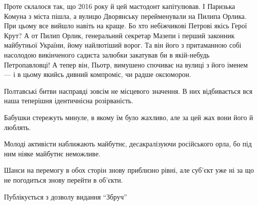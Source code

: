 Проте склалося так, що 2016 року й цей мастодонт капітулював. І Паризька Комуна
з міста пішла, а вулицю Дворянську перейменували на Пилипа Орлика. При цьому
все вийшло навіть на краще. Бо хто небіжчикові Петрові якісь Герої Крут? А от
Пилип Орлик, генеральний секретар Мазепи і перший законник майбутньої України,
йому найлютіший ворог. Та він його з притаманною собі насолодою викінченого
садиста залюбки закатував би в якій-небудь Петропавловці! А тепер він, Пьотр,
вимушено спочиває на вулиці з його іменем --- і в цьому якийсь дивний компроміс,
чи радше оксюморон.

Полтавські битви насправді зовсім не місцевого значення. В них відбивається вся
наша теперішня ідентичнісна розірваність.

Бабушки стережуть минуле, в якому їм було жахливо, але за цей жах вони його й
люблять.

Молоді активісти наближають майбутнє, десакралізуючи російського орла, бо під
ним ніяке майбутнє неможливе.

Шанси на перемогу в обох сторін знову приблизно рівні, але суб'єкт уже ні за що
не погодиться знову перейти в об'єкти.

Публікується з дозволу видання \enquote{Збруч}
